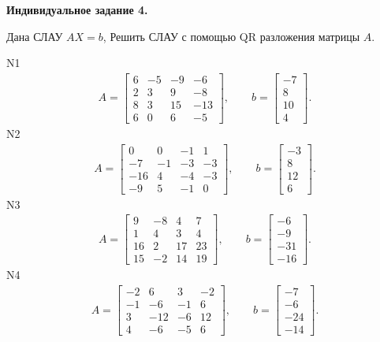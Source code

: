 \documentclass[11pt]{report}
\begin{document}
\pagestyle{empty}

{\bf Индивидуальное задание 4.}


Дана СЛАУ $AX = b$, 
Решить СЛАУ  с помощью  QR разложения матрицы $A$.


N1
\begin{align*}
 A = \left[\begin{matrix}6 & -5 & -9 & -6\\2 & 3 & 9 & -8\\8 & 3 & 15 & -13\\6 & 0 & 6 & -5\end{matrix}\right],
\qquad b = \left[\begin{matrix}-7\\8\\10\\4\end{matrix}\right]. 
 \end{align*}
N2
\begin{align*}
 A = \left[\begin{matrix}0 & 0 & -1 & 1\\-7 & -1 & -3 & -3\\-16 & 4 & -4 & -3\\-9 & 5 & -1 & 0\end{matrix}\right],
\qquad b = \left[\begin{matrix}-3\\8\\12\\6\end{matrix}\right]. 
 \end{align*}
N3
\begin{align*}
 A = \left[\begin{matrix}9 & -8 & 4 & 7\\1 & 4 & 3 & 4\\16 & 2 & 17 & 23\\15 & -2 & 14 & 19\end{matrix}\right],
\qquad b = \left[\begin{matrix}-6\\-9\\-31\\-16\end{matrix}\right]. 
 \end{align*}
N4
\begin{align*}
 A = \left[\begin{matrix}-2 & 6 & 3 & -2\\-1 & -6 & -1 & 6\\3 & -12 & -6 & 12\\4 & -6 & -5 & 6\end{matrix}\right],
\qquad b = \left[\begin{matrix}-7\\-6\\-24\\-14\end{matrix}\right]. 
 \end{align*}
\end{document}
